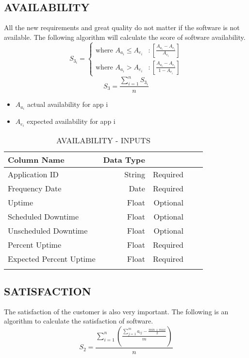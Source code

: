 \documentclass[SDSUThesis.tex]{subfiles}
\begin{document}
\subsection{AVAILABILITY}
All the new requirements and great quality do not matter if the software is not available.  
The following algorithm will calculate the score of software availability.
\begin{displaymath}
   S_{3_i} = \left\{
     \begin{array}{lr}
       \text{where } A_{a_i} \leq A_{e_i} & : \left[ \frac{A_{a_i} - A_{e_i}}{A_{e_i}} \right] \\
       \text{where } A_{a_i} > A_{e_i}  & : \left[ \frac{A_{a_i} - A_{e_i} }{1-A_{e_i}} \right]
     \end{array}
   \right.
\end{displaymath} 
\[
    S_3 = \frac{\sum^n_{i=1}S_{3_i}}{n}
\]

\begin{itemize}
\item $A_{a_i}$ actual availability for app i
\item $A_{e_i}$ expected availability for app i
\end{itemize}

\begin{longtable}{@{}l rr rr}

\toprule%
 \centering%
 {\bfseries Column Name}
 & {\bfseries Data Type}
 &  \\

\cmidrule[0.4pt](r{0.125em}){1-1}%
\cmidrule[0.4pt](lr{0.125em}){2-2}%
\cmidrule[0.4pt](l{0.125em}){3-3}%
\endhead

Application ID & String  & Required \\
\myrowcolour%
Frequency Date & Date & Required \\
Uptime & Float & Optional \\
\myrowcolour%
Scheduled Downtime & Float & Optional \\
Unscheduled Downtime & Float  & Optional \\
\myrowcolour%
Percent Uptime & Float & Required \\
Expected Percent Uptime & Float & Required \\

\bottomrule

\caption{AVAILABILITY - INPUTS}
\label{tab:avail}
\end{longtable}

\subsection{SATISFACTION}
The satisfaction of the customer is also very important.  The following is an algorithm to calculate the satisfaction of software.
\[
    S_2 = \frac{\sum^n_{i=1}\left( \frac{\sum^m_{j=1}a_{ij}- \frac{min + max}{2}}{m}  \right)}{n}
\]
\end{document}
